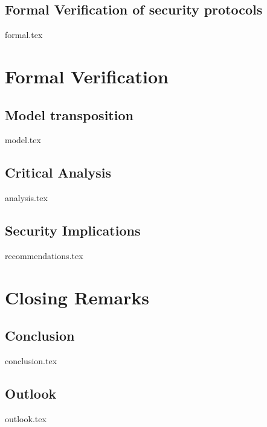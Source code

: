 \documentclass[a4paper,12pt,twoside]{report}
\begin{document}
\section{Formal Verification of security protocols}
\label{sec:formal}
{formal.tex}

\clearpage

\chapter{Formal Verification}
\label{chap:formal}

\section{Model transposition}
\label{sec:model}
{model.tex}

\section{Critical Analysis}
\label{sec:analysis}
{analysis.tex}

\section{Security Implications}
\label{sec:implications}
{recommendations.tex}

\clearpage

\chapter{Closing Remarks}
\label{chap:intro}

\section{Conclusion}
\label{sec:problem}
{conclusion.tex}

\section{Outlook}
\label{sec:outlook}
{outlook.tex}

\clearpage

\printbibliography[title={Literature},heading=bibintoc,nottype=online]

\printbibliography[title={Online Sources},heading=bibintoc,type=online]

\clearpage

\appendices
\end{document}
